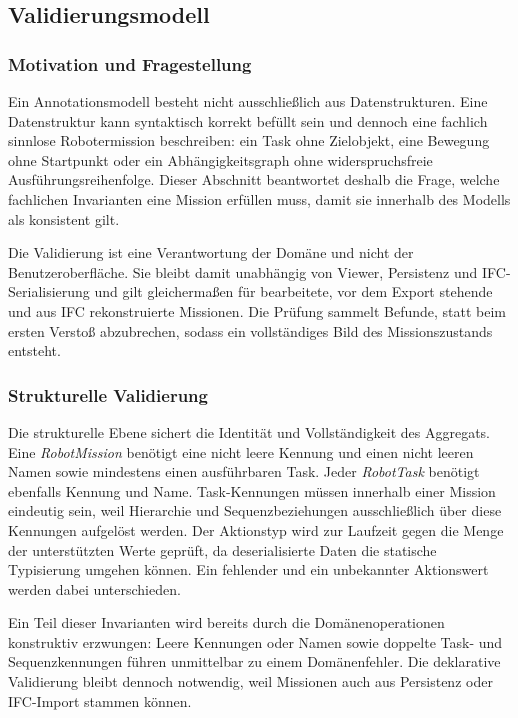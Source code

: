 \subsection{Validierungsmodell}\label{subsec:validierungsmodell}
\subsubsection{Motivation und Fragestellung}
Ein Annotationsmodell besteht nicht ausschließlich aus Datenstrukturen. Eine Datenstruktur kann
syntaktisch korrekt befüllt sein und dennoch eine fachlich sinnlose Robotermission beschreiben: ein
Task ohne Zielobjekt, eine Bewegung ohne Startpunkt oder ein Abhängigkeitsgraph ohne
widerspruchsfreie Ausführungsreihenfolge. Dieser Abschnitt beantwortet deshalb die Frage, welche
fachlichen Invarianten eine Mission erfüllen muss, damit sie innerhalb des Modells als konsistent
gilt.

Die Validierung ist eine Verantwortung der Domäne und nicht der Benutzeroberfläche. Sie bleibt damit
unabhängig von Viewer, Persistenz und IFC-Serialisierung und gilt gleichermaßen für bearbeitete,
vor dem Export stehende und aus IFC rekonstruierte Missionen. Die Prüfung sammelt Befunde, statt beim
ersten Verstoß abzubrechen, sodass ein vollständiges Bild des Missionszustands entsteht.

\subsubsection{Strukturelle Validierung}
Die strukturelle Ebene sichert die Identität und Vollständigkeit des Aggregats. Eine
\textit{RobotMission} benötigt eine nicht leere Kennung und einen nicht leeren Namen sowie
mindestens einen ausführbaren Task. Jeder \textit{RobotTask} benötigt ebenfalls Kennung und Name.
Task-Kennungen müssen innerhalb einer Mission eindeutig sein, weil Hierarchie und Sequenzbeziehungen
ausschließlich über diese Kennungen aufgelöst werden. Der Aktionstyp wird zur Laufzeit gegen die
Menge der unterstützten Werte geprüft, da deserialisierte Daten die statische Typisierung umgehen
können. Ein fehlender und ein unbekannter Aktionswert werden dabei unterschieden.

Ein Teil dieser Invarianten wird bereits durch die Domänenoperationen konstruktiv erzwungen: Leere
Kennungen oder Namen sowie doppelte Task- und Sequenzkennungen führen unmittelbar zu einem
Domänenfehler. Die deklarative Validierung bleibt dennoch notwendig, weil Missionen auch aus
Persistenz oder IFC-Import stammen können.

